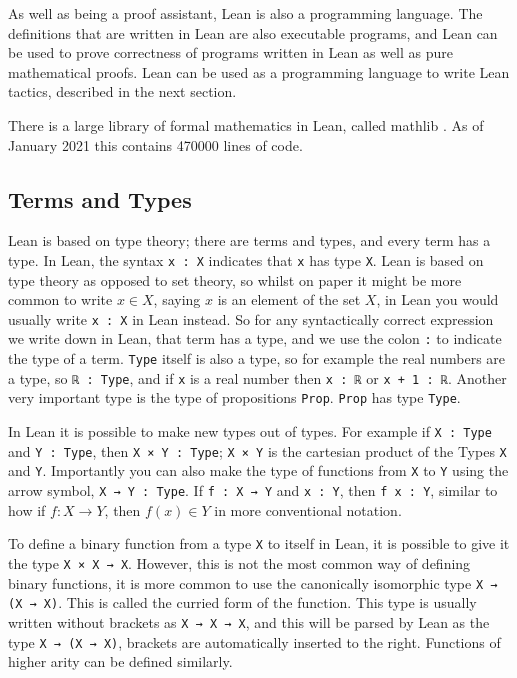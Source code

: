 \documentclass[12pt]{article} %
\theoremstyle{definition}
\theoremstyle{definition}
\theoremstyle{definition}
\theoremstyle{definition}
\theoremstyle{definition}
\theoremstyle{definition}
\begin{document}
As well as being a proof assistant, Lean is also a programming language. The definitions
that are written in Lean are also executable programs, and Lean can be used to prove correctness
of programs written in Lean as well as pure mathematical proofs. Lean can
be used as a programming language to write Lean tactics, described in the next section.

There is a large library of formal mathematics in Lean, called mathlib
\cite{ThemathlibCommunity2020}. As of January 2021 this contains 470000 lines of code.

\subsection{Terms and Types}

Lean is based on type theory; there are terms and types, and every term has a type.
In Lean, the syntax \lstinline{x : X} indicates that \lstinline{x} has type \lstinline{X}.
Lean is based on type theory as opposed to set theory, so whilst on paper it might
be more common to write $x \in X$, saying $x$ is an element of the set $X$, in Lean
you would usually write \lstinline{x : X} in Lean instead.
So for any syntactically correct expression we write down in Lean, that term has a type,
and we use the colon \lstinline{:} to indicate the type of a term.
\lstinline{Type} itself is also a type, so for example the real numbers are a type,
so \lstinline{ℝ : Type},
and if \lstinline{x} is a real number then \lstinline{x : ℝ} or \lstinline{x + 1 : ℝ}.
Another very important type is the type of propositions \lstinline{Prop}. \lstinline{Prop}
has type \lstinline{Type}.

In Lean it is possible to make new types out of types. For example if \lstinline{X : Type}
and \lstinline{Y : Type}, then \lstinline{X × Y : Type}; \lstinline{X × Y} is the cartesian
product of the Types \lstinline{X} and \lstinline{Y}. Importantly you can also make the type
of functions from \lstinline{X} to \lstinline{Y} using the arrow symbol,
\lstinline{X → Y : Type}. If \lstinline{f : X → Y} and \lstinline{x : Y}, then
\lstinline{f x : Y}, similar to how if $f : X \to Y$, then $f(x) \in Y$
in more conventional notation.

To define a binary function from a type \lstinline{X} to itself in Lean,
it is possible to give it the type \lstinline{X × X → X}. However, this is not
the most common way of defining binary functions, it is more common to use the
canonically isomorphic type \lstinline{X → (X → X)}.
This is called the curried form of the function. This type is usually written without
brackets as \lstinline{X → X → X}, and this will be parsed by Lean as the type
\lstinline{X → (X → X)}, brackets are automatically inserted to the right.
Functions of higher arity can be defined similarly.
\end{document}
